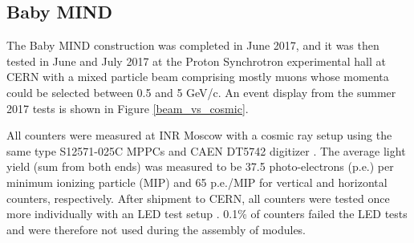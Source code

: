 \subsection{Baby MIND}
The Baby MIND construction was completed in June 2017, and it was then tested in June and July 2017 at the Proton Synchrotron experimental hall at CERN with a mixed particle beam comprising mostly muons whose momenta could be selected between 0.5 and 5 GeV/c. An event display from the summer 2017 tests is shown in Figure \ref{beam_vs_cosmic}.





All counters were measured at INR Moscow with a cosmic ray setup using the same type S12571-025C MPPCs and CAEN DT5742 digitizer \cite{Antonova:2017cdw}. The average light yield (sum from both ends) was measured to be 37.5 photo-electrons (p.e.) per minimum ionizing particle (MIP) and 65 p.e./MIP for vertical and horizontal counters, respectively. After shipment to CERN, all counters were tested once more individually with an LED test setup \cite{led_test_system}. 0.1\% of counters failed the LED tests and were therefore not used during the assembly of modules. 
